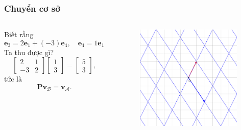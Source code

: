 \begin{frame}
    \frametitle{Chuyển cơ sở}
    \begin{columns}
        \begin{column}{0.5\textwidth}
            Biết rằng
           \[\mathbf{e}_3 =2\mathbf{e}_1 +(-3)\mathbf{e}_4 ,\quad \mathbf{e}_4 =1\mathbf{e}_1 +2\mathbf{e}_2 .\]
           Ta thu được gì?
          \[\begin{bmatrix}
    2&1\\-3&2
\end{bmatrix}\begin{bmatrix}
    1\\3
\end{bmatrix}=\begin{bmatrix}
    5\\3
\end{bmatrix},\] tức là
\[\mathbf{P}\mathbf{v}_{\mathcal{B}}=\mathbf{v}_{\mathcal{A}}.\]
        \end{column}
        \begin{column}{0.5\textwidth}
            \begin{figure}
                \centering
                \includegraphics[width=7cm, height=5cm]{Slides/Figure/LT10.png}
            \end{figure}
        \end{column}
    \end{columns}
\end{frame}
